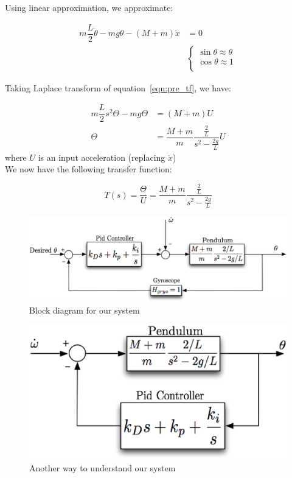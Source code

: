 \documentclass{notes}
\begin{document}
Using linear approximation, we approximate:

\begin{align}
  m\dfrac{L}{2}\ddot{\theta} - mg\theta - (M+m)\ddot{x} & = 0 \label{eqn:pre_tf} \\ 
  & \begin{cases}
    \sin\theta \approx \theta \nonumber\\
    \cos\theta \approx 1\nonumber\\
  \end{cases}
\end{align}
 
\noindent Taking Laplace transform of equation~\ref{eqn:pre_tf}, we have: 

\begin{align*}
  m\dfrac{L}{2}s^2\Theta - mg\Theta & = (M+m)U \\
  \Theta & = \dfrac{M+m}{m}\dfrac{\frac{2}{L}}{s^2 - \frac{2g}{L}}U
\end{align*}
where $U$ is an input acceleration (replacing $\ddot{x}$)\\

\noindent We now have the following transfer function:

\[
  T(s) = \dfrac{\Theta}{U} = \dfrac{M+m}{m}\dfrac{\frac{2}{L}}{s^2-\frac{2g}{L}}
\]

\begin{figure}[!h]
  \begin{center}
    \includegraphics[width=5 in]{pics/Block_Diagram.eps}
  \end{center}
  \caption{Block diagram for our system}
  \label{fig:block_diagram}
\end{figure}

\begin{figure}[!h]
  \begin{center}
    \includegraphics[width=4 in]{pics/Block_Diagram_3.eps}
  \end{center}
  \caption{Another way to understand  our system}
  \label{fig:block_diagram_3}
\end{figure}
\end{document}
